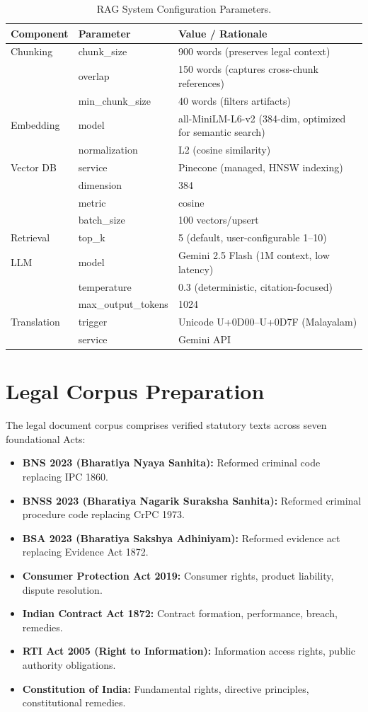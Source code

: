 \documentclass[12pt,a4paper]{report}
\begin{document}
\begin{table}[H]
\centering
\caption{RAG System Configuration Parameters.}
\label{tab:rag_config}
\small
\begin{tabularx}{\textwidth}{l p{4.2cm} X}
\toprule
\textbf{Component} & \textbf{Parameter} & \textbf{Value / Rationale} \\
\midrule
Chunking & chunk\_size & 900 words (preserves legal context) \\
 & overlap & 150 words (captures cross-chunk references) \\
 & min\_chunk\_size & 40 words (filters artifacts) \\
Embedding & model & all-MiniLM-L6-v2 (384-dim, optimized for semantic search) \\
 & normalization & L2 (cosine similarity) \\
Vector DB & service & Pinecone (managed, HNSW indexing) \\
 & dimension & 384 \\
 & metric & cosine \\
 & batch\_size & 100 vectors/upsert \\
Retrieval & top\_k & 5 (default, user-configurable 1–10) \\
LLM & model & Gemini 2.5 Flash (1M context, low latency) \\
 & temperature & 0.3 (deterministic, citation-focused) \\
 & max\_output\_tokens & 1024 \\
Translation & trigger & Unicode U+0D00–U+0D7F (Malayalam) \\
 & service & Gemini API \\
\bottomrule
\end{tabularx}
\end{table}

\section{Legal Corpus Preparation}
The legal document corpus comprises verified statutory texts across seven foundational Acts:
\begin{itemize}
    \item \textbf{BNS 2023 (Bharatiya Nyaya Sanhita):} Reformed criminal code replacing IPC 1860.
    \item \textbf{BNSS 2023 (Bharatiya Nagarik Suraksha Sanhita):} Reformed criminal procedure code replacing CrPC 1973.
    \item \textbf{BSA 2023 (Bharatiya Sakshya Adhiniyam):} Reformed evidence act replacing Evidence Act 1872.
    \item \textbf{Consumer Protection Act 2019:} Consumer rights, product liability, dispute resolution.
    \item \textbf{Indian Contract Act 1872:} Contract formation, performance, breach, remedies.
    \item \textbf{RTI Act 2005 (Right to Information):} Information access rights, public authority obligations.
    \item \textbf{Constitution of India:} Fundamental rights, directive principles, constitutional remedies.
\end{itemize}
\end{document}
